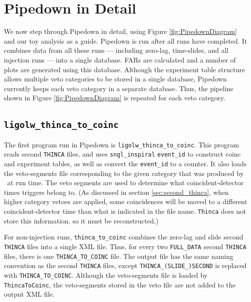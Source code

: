 \section{Pipedown in Detail}
\label{sec:PipedownDetail}

We now step through Pipedown in detail, using Figure \ref{fig:PipedownDiagram}
and our toy analysis as a guide. Pipedown is run after all \hipe runs have
completed. It combines data from all these runs --- including zero-lag,
time-slides, and all injection runs --- into a single database. \acp{FAR} are
calculated and a number of plots are generated using this database. Although
the experiment table structure allows multiple veto categories to be stored in
a single database, Pipedown currently keeps each veto category in a separate
database. Thus, the pipeline shown in Figure \ref{fig:PipedownDiagram} is
repeated for each veto category.

\subsection{\texttt{ligolw\_thinca\_to\_coinc}}
\label{sec:thinca_to_coinc}

The first program run in Pipedown is \texttt{ligolw\_thinca\_to\_coinc}. This
program reads second \texttt{THINCA} files, and uses \texttt{sngl\_inspiral}
\texttt{event\_id} to construct coinc and experiment tables, as well as convert
the \texttt{event\_id} to a counter. It also loads the veto-segments file
corresponding to the given category that was produced by \ihope~at run time.
The veto segments are used to determine what coincident-detector times triggers
belong to. (As discussed in section \ref{sec:second_thinca}, when higher
category vetoes are applied, some coincidences will be moved to a different
coincident-detector time than what is indicated in the file name.
\texttt{Thinca} does not store this information, so it must be reconstructed.)


For non-injection runs, \texttt{thinca\_to\_coinc} combines the zero-lag and
slide second \texttt{THINCA} files into a single XML file. Thus, for every two
\texttt{FULL\_DATA} second \texttt{THINCA} files, there is one
\texttt{THINCA\_TO\_COINC} file. The output file has the same naming convention
as the second \texttt{THINCA} files, except \texttt{THINCA\_(SLIDE\_)SECOND} is
replaced with \texttt{THINCA\_TO\_COINC}. Although the veto-segments file is
loaded by \texttt{ThincaToCoinc}, the veto-segments stored in the veto file are
not added to the output XML file.

